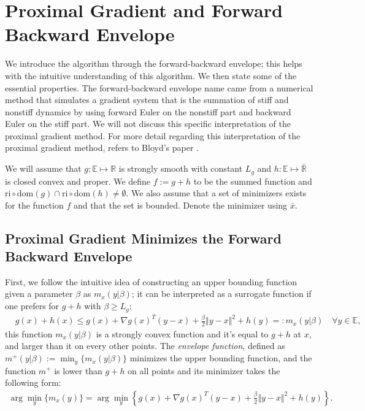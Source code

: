 \documentclass[]{article}
\theoremstyle{definition}
\begin{document}
\section{Proximal Gradient and Forward Backward Envelope}\label{sec:pg_forward_backward_env}
    We introduce the algorithm through the forward-backward envelope; this helps with the intuitive understanding of this algorithm. We then state some of the essential properties. The forward-backward envelope name came from a numerical method that simulates a gradient system that is the summation of stiff and nonstiff dynamics by using forward Euler on the nonstiff part and backward Euler on the stiff part. We will not discuss this specific interpretation of the proximal gradient method. For more detail regarding this interpretation of the proximal gradient method, refers to Bloyd's paper \cite{paper:bloyd}. 
    \begin{assumption}\label{assumption:1}
        We will assume that $g:\mathbb E\mapsto \mathbb R$ is strongly smooth with constant $L_g$ and $h:\mathbb E \mapsto \bar{\mathbb R}$ is closed convex and proper. We define $f := g + h$ to be the summed function and $\text{ri}\circ \text{dom}(g) \cap \text{ri}\circ \text{dom}(h) \neq \emptyset$. We also assume that a set of minimizers exists for the function $f$ and that the set is bounded. Denote the minimizer using $\bar x$. 
    \end{assumption}
    
    \subsection{Proximal Gradient Minimizes the Forward Backward Envelope}
        First, we follow the intuitive idea of constructing an upper bounding function given a parameter $\beta$ as  $m_x(y|\beta)$; it can be interpreted as a surrogate function if one prefers for $g + h$ with $\beta \ge L_g$: 
        \begin{align*}
            & g(x) + h(x) \le 
            g(x) + \nabla g(x)^T(y - x) + \frac{\beta}{2} \Vert y - x\Vert^2
            + h(y) =: m_x(y|\beta) \quad \forall y \in \mathbb E, 
        \end{align*}
        this function $m_x(y|\beta)$ is a strongly convex function and it's equal to $g + h$ at $x$, and larger than it on every other points. The \emph{envelope function}, defined as $m^+(y|\beta):= \min_y \{m_x(y|\beta)\}$ minimizes the upper bounding function, and the function $m^+$ is lower than $g + h$ on all points and its minimizer takes the following form: 
        \begin{align*}
            \arg\min_{y} \{m_x(y)\} 
            = \arg\min_{y}\left\lbrace
                g(x) + \nabla g(x)^T(y - x) + \frac{\beta}{2}
                \Vert y - x\Vert^2 + h(y) 
            \right\rbrace. 
        \end{align*}
        
\end{document}
